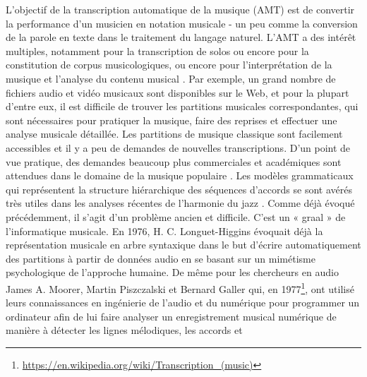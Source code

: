 L'objectif de la transcription automatique de la musique (AMT)
\cite{future_directions} est de convertir la performance d'un musicien en
notation musicale - un peu comme 
la conversion de la parole en texte dans le
traitement du langage naturel. L’AMT a des intérêt multiples, notamment pour la
transcription de solos 
ou encore pour la constitution de corpus musicologiques,
ou encore pour l'interprétation de la musique et l'analyse du contenu musical
\cite{SHIBATA2021262}. 
Par exemple, un grand nombre de fichiers audio et vidéo
musicaux sont disponibles sur le Web, et pour la plupart d'entre eux, il est
difficile de trouver les partitions musicales correspondantes, qui sont
nécessaires pour pratiquer la musique, faire des reprises et effectuer une
analyse musicale détaillée. Les partitions de musique classique sont facilement
accessibles et il y a peu de demandes de nouvelles transcriptions. 
D'un point
de vue pratique, des demandes beaucoup plus commerciales et académiques sont
attendues dans le domaine de la musique populaire \cite{SHIBATA2021262}. 
Les modèles grammaticaux qui représentent la structure hiérarchique des séquences
d'accords se sont avérés très utiles dans les analyses récentes de l'harmonie
du jazz \cite{harasimjazz}.
Comme déjà évoqué précédemment, il s’agit d’un problème ancien et difficile.
C’est un « graal » de l’informatique musicale. En 1976, H. C. Longuet-Higgins
\cite{first_one} évoquait déjà la représentation musicale en arbre syntaxique
dans le but d’écrire automatiquement des partitions à partir de données audio
en se basant sur un mimétisme psychologique de l’approche humaine. De même pour
les chercheurs en audio James A. Moorer, Martin Piszczalski et Bernard Galler
qui, en 1977\footnote{\url{https://en.wikipedia.org/wiki/Transcription_(music)}}, 
ont utilisé leurs connaissances en ingénierie de l’audio et du numérique
pour programmer un ordinateur afin de lui faire analyser un enregistrement
musical numérique de manière à détecter les lignes mélodiques, les accords et
